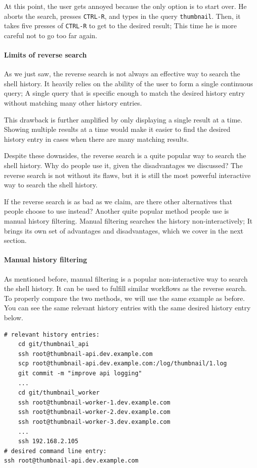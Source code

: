 At this point, the user gets annoyed because the only option is to start over. He aborts the search, presses \verb|CTRL-R|, and types in the query \verb|thumbnail|. Then, it takes five presses of \verb|CTRL-R| to get to the desired result; This time he is more careful not to go too far again.


\paragraph{Limits of reverse search}

As we just saw, the reverse search is not always an effective way to search the shell history. It heavily relies on the ability of the user to form a single continuous query; A single query that is specific enough to match the desired history entry without matching many other history entries. 

This drawback is further amplified by only displaying a single result at a time. Showing multiple results at a time would make it easier to find the desired history entry in cases when there are many matching results. 

Despite these downsides, the reverse search is a quite popular way to search the shell history. Why do people use it, given the disadvantages we discussed? The reverse search is not without its flaws, but it is still the most powerful interactive way to search the shell history. %

If the reverse search is as bad as we claim, are there other alternatives that people choose to use instead? Another quite popular method people use is manual history filtering. Manual filtering searches the history non-interactively; It brings its own set of advantages and disadvantages, which we cover in the next section.


\paragraph{Manual history filtering}

As mentioned before, manual filtering is a popular non-interactive way to search the shell history. It can be used to fulfill similar workflows as the reverse search. To properly compare the two methods, we will use the same example as before. You can see the same relevant history entries with the same desired history entry below.


\begin{verbatim}
# relevant history entries:
    cd git/thumbnail_api
    ssh root@thumbnail-api.dev.example.com
    scp root@thumbnail-api.dev.example.com:/log/thumbnail/1.log
    git commit -m "improve api logging"
    ...
    cd git/thumbnail_worker
    ssh root@thumbnail-worker-1.dev.example.com
    ssh root@thumbnail-worker-2.dev.example.com
    ssh root@thumbnail-worker-3.dev.example.com
    ...
    ssh 192.168.2.105
# desired command line entry:
ssh root@thumbnail-api.dev.example.com
\end{verbatim}

